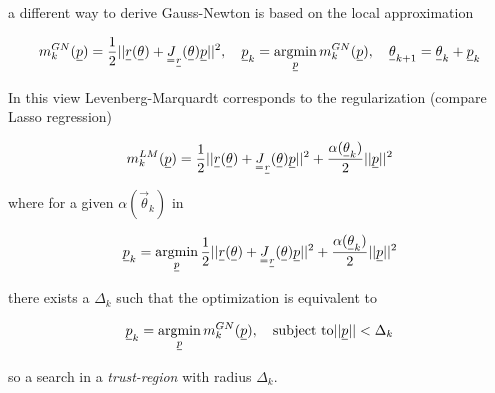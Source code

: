 a different way to derive Gauss-Newton is based on the local approximation

\begin{equation}
    m_k^{GN}(\vec{p}) = \frac{1}{2} ||\vec{r}(\vec{\theta}) +  \mat{J}_\vec{r}(\vec{\theta}) \vec{p}||^2, \quad \vec{p}_k = \argmin_\vec{p} m_k^{GN}(\vec{p}), \quad \vec{\theta}_{k+1} = \vec{\theta}_k + \vec{p}_k
\end{equation}

In this view Levenberg-Marquardt corresponds to the regularization (compare Lasso regression)

\begin{equation}
    m_k^{LM}(\vec{p}) = \frac{1}{2} ||\vec{r}(\vec{\theta}) +  \mat{J}_\vec{r}(\vec{\theta}) \vec{p}||^2 + \frac{\alpha(\vec{\theta}_k)}{2} ||\vec{p}||^2
\end{equation}

where for a given $\alpha(\vec{\theta}_k)$ in

\begin{equation}
    \vec{p}_k = \argmin_\vec{p} \frac{1}{2} ||\vec{r}(\vec{\theta}) +  \mat{J}_\vec{r}(\vec{\theta}) \vec{p}||^2 + \frac{\alpha(\vec{\theta}_k)}{2} ||\vec{p}||^2
\end{equation}

there exists a $\Delta_k$ such that the optimization is equivalent to

\begin{equation}
    \vec{p}_k = \argmin_\vec{p} m_k^{GN}(\vec{p}), \quad \text{subject to} ||\vec{p}||<\Delta_k
\end{equation}

so a search in a \textit{trust-region} with radius $\Delta_k$.

\pagebreak